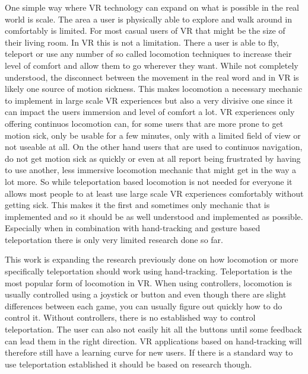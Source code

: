 One simple way where VR technology can expand on what is possible in the real world is scale. The area a user is physically able to explore and walk around in comfortably is limited. For most casual users of VR that might be the size of their living room. In VR this is not a limitation. There a user is able to fly, teleport or use any number of so called locomotion techniques to increase their level of comfort and allow them to go wherever they want. While not completely understood, the disconnect between the movement in the real word and in VR is likely one source of motion sickness. This makes locomotion a necessary mechanic to implement in large scale VR experiences but also a very divisive one since it can impact the users immersion and level of comfort a lot. VR experiences only offering continuos locomotion can, for some users that are more prone to get motion sick, only be usable for a few minutes, only with a limited field of view or not useable at all. On the other hand users that are used to continuos navigation, do not get motion sick as quickly or even at all report being frustrated by having to use another, less immersive locomotion mechanic that might get in the way a lot more. So while teleportation based locomotion is not needed for everyone it allows most people to at least use large scale VR experiences comfortably without getting sick. This makes it the first and sometimes only mechanic that is implemented and so it should be as well understood and implemented as possible. Especially when in combination with hand-tracking and gesture based teleportation there is only very limited research done so far.

This work is expanding the research previously done on how locomotion or more specifically teleportation should work using hand-tracking. Teleportation is the most popular form of locomotion in VR. When using controllers, locomotion is usually controlled using a joystick or button and even though there are slight differences between each game, you can usually figure out quickly how to do control it. Without controllers, there is no established way to control teleportation. The user can also not easily hit all the buttons until some feedback can lead them in the right direction. VR applications based on hand-tracking will therefore still have a learning curve for new users. If there is a standard way to use teleportation established it should be based on research though. 






